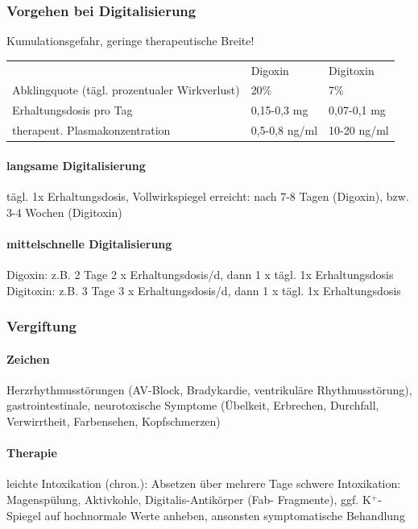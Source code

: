 \documentclass[10pt,a4paper]{report}
\begin{document}
\subsubsection{Vorgehen bei Digitalisierung}Kumulationsgefahr, geringe therapeutische Breite!\\
\begin{tabularx}{\textwidth}{XXX}
&Digoxin&Digitoxin\\
Abklingquote (tägl. prozentualer Wirkverlust)&20\%&7\%\\
Erhaltungsdosis pro Tag&0,15-0,3 mg&0,07-0,1 mg\\
therapeut. Plasmakonzentration&0,5-0,8 ng/ml&10-20 ng/ml\\
\end{tabularx}
\paragraph{langsame Digitalisierung}tägl. 1x Erhaltungsdosis, Vollwirkspiegel erreicht: nach 7-8 Tagen (Digoxin), bzw. 3-4 Wochen (Digitoxin)
\paragraph{mittelschnelle Digitalisierung}
Digoxin:   z.B. 2 Tage 2 x Erhaltungsdosis/d, dann 1 x tägl. 1x Erhaltungsdosis\\ Digitoxin: z.B. 3 Tage 3 x Erhaltungsdosis/d, dann 1 x tägl. 1x Erhaltungsdosis
\subsubsection{Vergiftung}
\paragraph{Zeichen} Herzrhythmusstörungen (AV-Block, Bradykardie, ventrikuläre Rhythmusstörung), gastrointestinale, neurotoxische Symptome (Übelkeit, Erbrechen, Durchfall, Verwirrtheit, Farbensehen, Kopfschmerzen)
\paragraph{Therapie}leichte Intoxikation (chron.): Absetzen über mehrere Tage schwere Intoxikation:	Magenspülung, Aktivkohle, Digitalis-Antikörper (Fab-				Fragmente), ggf. K$^+$-Spiegel auf hochnormale Werte anheben, ansonsten symptomatische Behandlung
\end{document}
